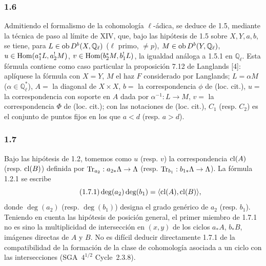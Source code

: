\subsubsection*{1.6}
Admitiendo el formalismo de la cohomología $\ell$-ádica, se deduce de 1.5, mediante la técnica de paso al límite de XIV, que, bajo las hipótesis de 1.5 sobre $X,Y,a,b$, se tiene, para $L\in\operatorname{ob} D^b(X,\mathbb Q_\ell)$ ($\ell$ primo, $\ne p$), $M\in\operatorname{ob} D^b(Y,\mathbb Q_\ell)$, $u\in\operatorname{Hom}(a_1^*L,a_2^!M)$, $v\in\operatorname{Hom}(b_2^*M,b_1^!L)$, la igualdad análoga a 1.5.1 en $\mathbb Q_\ell$. Esta fórmula contiene como caso particular la proposición 7.12 de Langlands [4]: aplíquese la fórmula con $X=Y$, $M$ el haz $F$ considerado por Langlands; $L=\alpha M$ ($\alpha\in\mathbb Q_\ell^*$), $A=$ la diagonal de $X\times X$, $b=$ la correspondencia $\phi$ de (loc. cit.), $u=$ la correspondencia con soporte en $A$ dada por $\alpha^{-1}:L\to M$, $v=$ la correspondencia $\Phi$ de (loc. cit.); con las notaciones de (loc. cit.), $C_1$ (resp. $C_2$) es el conjunto de puntos fijos en los que $a<d$ (resp. $a>d$).

\subsubsection*{1.7}
Bajo las hipótesis de 1.2, tomemos como $u$ (resp. $v$) la correspondencia $\operatorname{cl}(A)$ (resp. $\operatorname{cl}(B)$) definida por $\operatorname{Tr}_{a_2}:a_{2*}\Lambda\to\Lambda$ (resp. $\operatorname{Tr}_{b_1}:b_{1*}\Lambda\to\Lambda$). La fórmula 1.2.1 se escribe
\begin{equation}\tag{1.7.1}
\deg(a_2)\deg(b_1)=\langle \operatorname{cl}(A),\operatorname{cl}(B)\rangle,
\end{equation}
donde $\deg(a_2)$ (resp. $\deg(b_1)$) designa el grado genérico de $a_2$ (resp. $b_1$). Teniendo en cuenta las hipótesis de posición general, el primer miembro de 1.7.1 no es sino la multiplicidad de intersección en $(x,y)$ de los ciclos $a_*A$, $b_*B$, imágenes directas de $A$ y $B$. No es difícil deducir directamente 1.7.1 de la compatibilidad de la formación de la clase de cohomología asociada a un ciclo con las intersecciones (SGA~$4^{1/2}$ Cycle~2.3.8).


